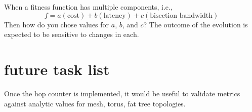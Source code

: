 \documentclass[pdftex]{article}
\begin{document}
When a fitness function has multiple components, i.e.,
\begin{equation}
 f=a(\textrm{cost})+b(\textrm{latency})+c(\textrm{bisection\ bandwidth})
\end{equation}
Then how do you chose values for $a$, $b$, and $c$? The outcome of the evolution is expected to be sensitive to changes in each.
 
\section{future task list}

Once the hop counter is implemented, it would be useful to validate metrics against analytic values for mesh, torus, fat tree topologies.
\end{document}
